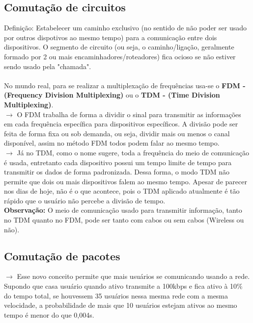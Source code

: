 \documentclass[12pt]{article}
\begin{document}
    \subsection{Comutação de circuitos}
    Definição: Estabelecer um caminho exclusivo (no sentido de não poder ser usado por outros dispotivos ao mesmo tempo) para a comunicação entre dois dispositivos. O segmento de circuito (ou seja, o caminho/ligação, geralmente formado por 2 ou mais encaminhadores/roteadores) fica ocioso se não estiver sendo usado pela "chamada".
    \\~\\No mundo real, para se realizar a multiplexação de frequências usa-se o \textbf{FDM - (Frequency Division Multiplexing)} ou o \textbf{TDM - (Time Division Multiplexing)}. 
    \\$\rightarrow$ O FDM trabalha de forma a dividir o sinal para transmitir as informações em cada frequência específica para dispositivos específicos. A divisão pode ser feita de forma fixa ou sob demanda, ou seja, dividir mais ou menos o canal disponível, assim no método FDM todos podem falar ao mesmo tempo.
    \\$\rightarrow$ Já no TDM, como o nome sugere, toda a frequência do meio de comunicação é usada, entretanto cada dispositivo possui um tempo limite de tempo para transmitir os dados de forma padronizada. Dessa forma, o modo TDM não permite que dois ou mais dispositivos falem ao mesmo tempo. Apesar de parecer nos dias de hoje, não é o que acontece, pois o TDM aplicado atualmente é tão rápido que o usuário não percebe a divisão de tempo.
    \\\textbf{Observação:} O meio de comunicação usado para transmitir informação, tanto no TDM quanto no FDM, pode ser tanto com cabos ou sem cabos (Wireless ou não).

    \subsection{Comutação de pacotes}
    $\rightarrow$ Esse novo conceito permite que mais usuários se comunicando usando a rede. 
    \\Supondo que casa usuário quando ativo transmite a 100kbps e fica ativo à 10\% do tempo total, se houvessem 35 usuários nessa mesma rede com a mesma velocidade, a probabilidade de mais que 10 usuários estejam ativos ao mesmo tempo é menor do que 0,004s.
\end{document}
